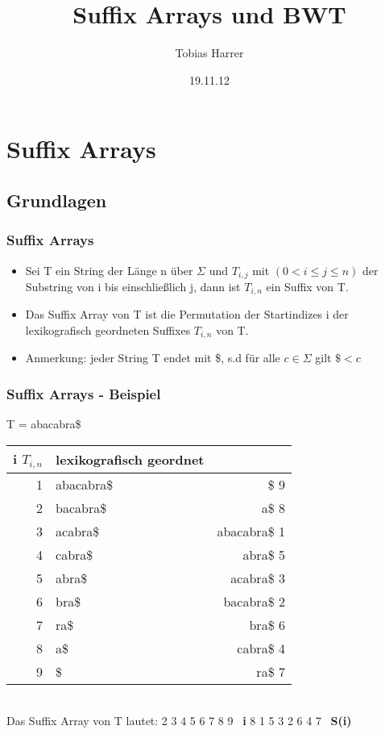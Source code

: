 \documentclass{beamer}
\title{Suffix Arrays und BWT}
\author{Tobias Harrer}
\date{19.11.12}
\begin{document}
\maketitle
\frame{\tableofcontents[currentsection]}
 
\section{Suffix Arrays}
\subsection{Grundlagen}
\begin{frame} %
  \frametitle{Suffix Arrays} %
  \begin{Definition} %
  \begin{itemize}
  \item Sei T ein String der Länge n über $\Sigma$ und $T_{i,j}$ mit $(0<i\leq j\leq n)$ der Substring von i bis einschließlich j, dann ist $T_{i,n}$ ein Suffix von T.
  \item Das Suffix Array von T ist die Permutation der Startindizes i der lexikografisch geordneten Suffixes $T_{i,n}$ von T.
  \item Anmerkung: jeder String T endet mit \$, s.d für alle $c \in \Sigma$ gilt $\$ < c$ 
  \end{itemize}
  \end{Definition}
\end{frame}
\begin{frame}
\frametitle{Suffix Arrays - Beispiel} %
T = \glqq abacabra\$\grqq\\[5mm]

\begin{tabular}{r|l<{\ttfamily} r<{\ttfamily}}
\textbf{i $T_{i,n}$} & \textbf{lexikografisch geordnet}\\\hline
1 & abacabra\$ & \$ 9\\
2 & bacabra\$ & a\$ 8\\
3 & acabra\$ & abacabra\$ 1\\
4 & cabra\$ & abra\$ 5\\
5 & abra\$ & acabra\$ 3\\
6 & bra\$ & bacabra\$ 2\\
7 & ra\$ & bra\$ 6\\
8 & a\$ & cabra\$ 4\\
9 & \$ & ra\$ 7\\
\end{tabular}\\[5mm]
Das Suffix Array von T lautet: \newline
{\ttfamily
{} 2 3 4 5 6 7 8 9 \textrightarrow\ \textbf{i}\newline
{} 8 1 5 3 2 6 4 7 \textrightarrow\ \textbf{S(i)}
}
\end{frame}
\end{document}
